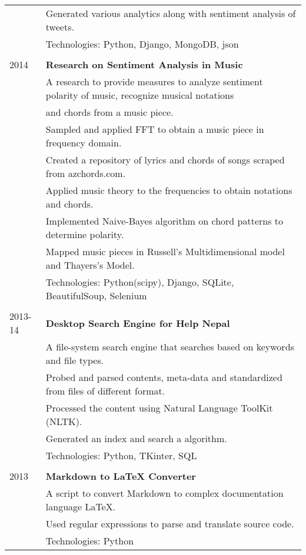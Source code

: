 \documentclass[letterpaper,10pt,oneside]{article}
\newcommand{\nextitem}{\par\hspace*{\labelsep}\textbullet\hspace*{\labelsep}}
\begin{document}
\begin{tabular}{l l}
         & \footnotesize{\nextitem  Generated various analytics along with sentiment analysis of tweets.} \\
         & Technologies: Python, Django, MongoDB, json \\
         \\
 2014    & \textbf{Research on Sentiment Analysis in Music} \\
         & A research to provide measures to analyze sentiment polarity of music, recognize musical notations \\
         & and chords from a music piece. \\
         & \footnotesize{\nextitem Sampled and applied FFT to obtain a music piece in frequency domain.} \\
         & \footnotesize{\nextitem Created a repository of lyrics and chords of songs scraped from azchords.com.} \\
         & \footnotesize{\nextitem Applied music theory to the frequencies to obtain notations and chords.} \\
         & \footnotesize{\nextitem Implemented Naive-Bayes algorithm on chord patterns to determine polarity.} \\
         & \footnotesize{\nextitem Mapped music pieces in Russell’s Multidimensional model and Thayers’s Model.} \\
         & Technologies: Python(scipy), Django, SQLite, BeautifulSoup, Selenium \\
         \\
 2013-14 & \textbf{Desktop Search Engine for Help Nepal} \\
         & A file-system search engine that searches based on keywords and file types. \\
         & \footnotesize{\nextitem Probed and parsed contents, meta-data and standardized from files of different format.} \\
         & \footnotesize{\nextitem Processed the content using Natural Language ToolKit (NLTK).} \\
         & \footnotesize{\nextitem Generated an index and search a algorithm.} \\
         & Technologies: Python, TKinter, SQL \\
         \\
 2013    & \textbf{Markdown to LaTeX Converter} \\
         & A script to convert Markdown to complex documentation language LaTeX. \\
         & \footnotesize{\nextitem Used regular expressions to parse and translate source code.} \\
         & Technologies: Python \\

\end{tabular}
\end{document}
